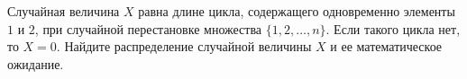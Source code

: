 \documentclass{article}
\begin{document}
Случайная величина $X$ равна длине цикла, содержащего одновременно элементы $1$ и $2$, при случайной перестановке множества $\{1,2,\ldots, n\}$. Если такого цикла нет, то $X=0$. Найдите распределение случайной величины $X$ и ее математическое ожидание.
\end{document}

